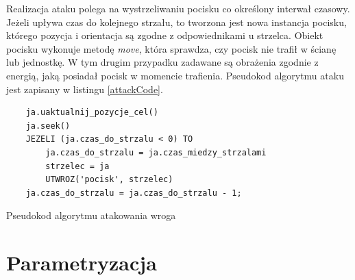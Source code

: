 Realizacja ataku polega na wystrzeliwaniu pocisku co określony interwał czasowy. Jeżeli upływa czas do kolejnego strzału, to tworzona jest nowa instancja pocisku, którego pozycja i orientacja są zgodne z odpowiednikami u strzelca. Obiekt pocisku wykonuje metodę \emph{move}, która sprawdza, czy pocisk nie trafił w ścianę lub jednostkę. W tym drugim przypadku zadawane są obrażenia zgodnie z energią, jaką posiadał pocisk w momencie trafienia. Pseudokod algorytmu ataku jest zapisany w listingu \ref{attackCode}.

\begin{table}
\begin{center}
\begin{lstlisting}
	ja.uaktualnij_pozycje_cel()
	ja.seek()				
	JEZELI (ja.czas_do_strzalu < 0) TO
		ja.czas_do_strzalu = ja.czas_miedzy_strzalami
		strzelec = ja
		UTWROZ('pocisk', strzelec)
	ja.czas_do_strzalu = ja.czas_do_strzalu - 1;
\end{lstlisting}
\caption {Pseudokod algorytmu atakowania wroga}
\label{attackCode}
\end{center}
\end{table}

\section{Parametryzacja}
